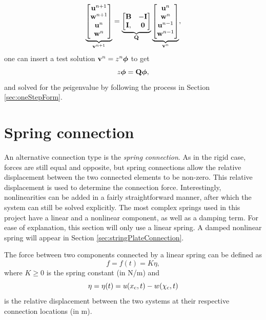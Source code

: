 \begin{equation}
    \underbrace{\begin{bmatrix}
        \mathbf{u}^{n+1}\\
        \mathbf{w}^{n+1}\\
        \mathbf{u}^{n}\\
        \mathbf{w}^{n}
    \end{bmatrix}}_{\mathbf{v}^{n+1}} = \underbrace{\begin{bmatrix}
        \mathbf{B} & -\mathbf{I}\\
        \mathbf{I},& \mathbf{0}
    \end{bmatrix}}_{\mathbf{Q}}\underbrace{\begin{bmatrix}
        \mathbf{u}^{n}\\
        \mathbf{w}^{n}\\
        \mathbf{u}^{n-1}\\
        \mathbf{w}^{n-1}
    \end{bmatrix}}_{\mathbf{v}^n},
\end{equation}
one can insert a test solution $\mathbf{v}^n=z^n\boldsymbol{\phi}$ to get
\begin{equation*}
    z\boldsymbol{\phi} = \mathbf{Q}\boldsymbol{\phi},
\end{equation*}
and solved for the $p$\th eigenvalue by following the process in Section \ref{sec:oneStepForm}.


\section{Spring connection}\label{sec:springConnection}
An alternative connection type is the \textit{spring connection}. As in the rigid case, forces are still equal and opposite, but spring connections allow the relative displacement between the two connected elements to be non-zero. This relative displacement is used to determine the connection force. Interestingly, nonlinearities can be added in a fairly straightforward manner, after which the system can still be solved explicitly. The most complex springs used in this project have a linear and a nonlinear component, as well as a damping term. For ease of explanation, this section will only use a linear spring. A damped nonlinear spring will appear in Section \ref{sec:stringPlateConnection}.

The force between two components connected by a linear spring can be defined as
\begin{equation}\label{eq:linearSpringForceCont}
    f = f(t) = K\eta,
\end{equation}
where $K\geq 0$ is the spring constant (in N/m) and
\begin{equation}
    \eta = \eta(t) = u(x_{\text{c}}, t) - w(\chi_{\text{c}}, t)
\end{equation}
is the relative displacement between the two systems at their respective connection locations (in m). %

